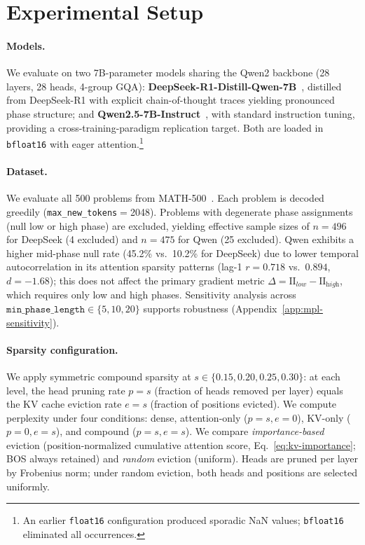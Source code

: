 \section{Experimental Setup}
\label{sec:experimental-setup}

\paragraph{Models.}
We evaluate on two 7B-parameter models sharing the Qwen2 backbone (28 layers, 28 heads, 4-group GQA): \textbf{DeepSeek-R1-Distill-Qwen-7B}~\cite{deepseek-r1-2025}, distilled from DeepSeek-R1 with explicit chain-of-thought traces yielding pronounced phase structure; and \textbf{Qwen2.5-7B-Instruct}~\cite{qwen25-2024}, with standard instruction tuning, providing a cross-training-paradigm replication target. Both are loaded in \texttt{bfloat16} with eager attention.\footnote{An earlier \texttt{float16} configuration produced sporadic NaN values; \texttt{bfloat16} eliminated all occurrences.}

\paragraph{Dataset.}
We evaluate all 500 problems from MATH-500~\cite{math500-neurips2021}. Each problem is decoded greedily (\texttt{max\_new\_tokens}$=$2048). Problems with degenerate phase assignments (null low or high phase) are excluded, yielding effective sample sizes of $n{=}496$ for DeepSeek (4 excluded) and $n{=}475$ for Qwen (25 excluded). Qwen exhibits a higher mid-phase null rate (45.2\% vs.\ 10.2\% for DeepSeek) due to lower temporal autocorrelation in its attention sparsity patterns (lag-1 $r{=}0.718$ vs.\ $0.894$, $d{=}-1.68$); this does not affect the primary gradient metric $\Delta = \mathrm{II}_{\textit{low}} - \mathrm{II}_{\textit{high}}$, which requires only low and high phases. Sensitivity analysis across $\texttt{min\_phase\_length} \in \{5, 10, 20\}$ supports robustness (Appendix~\ref{app:mpl-sensitivity}).

\paragraph{Sparsity configuration.}
We apply symmetric compound sparsity at $s \in \{0.15, 0.20, 0.25, 0.30\}$: at each level, the head pruning rate $p{=}s$ (fraction of heads removed per layer) equals the KV cache eviction rate $e{=}s$ (fraction of positions evicted). We compute perplexity under four conditions: dense, attention-only ($p{=}s, e{=}0$), KV-only ($p{=}0, e{=}s$), and compound ($p{=}s, e{=}s$). We compare \emph{importance-based} eviction (position-normalized cumulative attention score, Eq.~\ref{eq:kv-importance}; BOS always retained) and \emph{random} eviction (uniform). Heads are pruned per layer by Frobenius norm; under random eviction, both heads and positions are selected uniformly.

